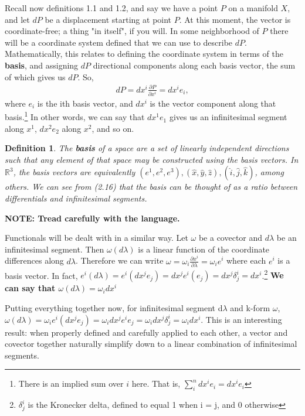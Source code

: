 \documentclass{book}
\newtheorem{defn}[equation]{Definition}
\begin{document}
Recall now definitions 1.1 and 1.2, and say we have a point $P$ on a manifold $X$, and let $dP$ be a displacement starting at point $P$. At this moment, the vector is coordinate-free; a thing "in itself", if you will. In some neighborhood of $P$ there will be a coordinate system defined that we can use to describe $dP$. Mathematically, this relates to defining the coordinate system in terms of the \textbf{basis}, and assigning $dP$ directional components  along each basis vector, the sum of which gives us $dP$. So, \begin{gather}dP = dx^i \frac{\partial P}{\partial x^i} = dx^i e_i,\end{gather} where $e_i$ is the ith basis vector, and $dx^i$ is the vector component along that basis.\footnote{There is an implied sum over $i$ here. That is, $\sum_i^n dx^i e_i = dx^i e_i$} In other words, we can say that $dx^1e_1$ gives us an infinitesimal segment along $x^1$, $dx^2e_2$ along $x^2$, and so on. 


\begin{defn}
	The \textbf{basis} of a space are a set of linearly independent directions such that any element of that space may be constructed using the basis vectors. In $\mathbb{R}^3$, the basis vectors are equivalently $(e^1, e^2, e^3), (\hat{x}, \hat{y}, \hat{z}), (\hat{i}, \hat{j}, \hat{k})$, among others. We can see from (2.16) that the basis can be thought of as a ratio between differentials and infinitesimal segments. 
\end{defn}




\textbf{NOTE: Tread carefully with the language. }

Functionals will be dealt with in a similar way. Let $\omega$ be a covector and $d\lambda$ be an infinitesimal segment. Then $\omega(d\lambda)$ is a linear function of the coordinate differences along $d\lambda$. Therefore we can write $\omega = \omega_i \frac{\partial x^i}{\partial \lambda} = \omega_i e^i$ where each $e^i$ is a basis vector. In fact, $e^i(d\lambda) = e^i(dx^j e_j) = dx^j e^i(e_j) = dx^j \delta^i_j = dx^i$.\footnote{$\delta^i_j$ is the Kronecker delta, defined to equal 1 when i = j, and 0 otherwise}
\textbf{We can say that $\omega(d\lambda) = \omega_i dx^i$}

Putting everything together now, for infinitesimal segment d$\lambda$ and k-form $\omega$, $\omega(d\lambda) = \omega_ie^i(dx^je_j) = \omega_idx^je^ie_j = \omega_idx^j\delta^i_j = \omega_i dx^i$. This is an interesting result: when properly defined and carefully applied to each other, a vector and covector together naturally simplify down to a linear combination of infinitesimal segments. 
\end{document}

